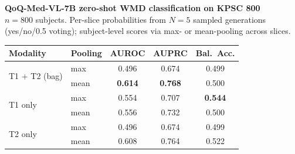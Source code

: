 \documentclass[11pt]{article}
\begin{document}
\begin{center}
{\large\bfseries QoQ-Med-VL-7B zero-shot WMD classification on KPSC 800}\\[2pt]
\small $n=800$ subjects. Per-slice probabilities from $N=5$ sampled
generations (yes/no/0.5 voting); subject-level scores via max- or
mean-pooling across slices.

\vspace{1em}

\renewcommand{\arraystretch}{1.2}
\begin{tabular}{l l c c c}
\toprule
Modality & Pooling & AUROC & AUPRC & Bal.\ Acc. \\
\midrule
\multirow{2}{*}{T1 + T2 (bag)} & max  & 0.496 & 0.674 & 0.499 \\
                                & mean & \textbf{0.614} & \textbf{0.768} & 0.500 \\
\midrule
\multirow{2}{*}{T1 only}       & max  & 0.554 & 0.707 & \textbf{0.544} \\
                                & mean & 0.556 & 0.732 & 0.500 \\
\midrule
\multirow{2}{*}{T2 only}       & max  & 0.496 & 0.674 & 0.499 \\
                                & mean & 0.608 & 0.764 & 0.522 \\
\bottomrule
\end{tabular}
\end{center}
\end{document}
